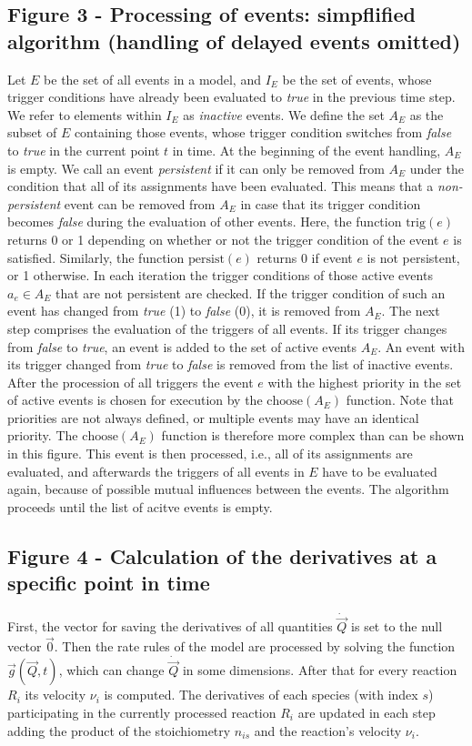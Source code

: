 \documentclass[10pt]{bmc_article}
\newenvironment{bmcformat}{\baselineskip20pt\sloppy\setboolean{publ}{false}}{\baselineskip20pt\sloppy}
\newcommand{\true}{\emph{true}}
\newcommand{\false}{\emph{false}}
\begin{document}
\begin{bmcformat}
\subsection*{Figure 3 - Processing of events: simpflified algorithm (handling of delayed events omitted)}
Let $E$ be the set of all events in a model, and $I_E$ be the set of events, whose trigger
conditions have already been evaluated to \true{} in the previous time step. We refer to elements within
$I_E$ as \emph{inactive} events. We define the set $A_E$ as the subset of $E$ containing those events,
whose trigger condition switches from \false{} to \true{} in the current point $t$ in time. At the beginning
of the event handling, $A_E$ is empty. We call an event \emph{persistent} if it can only be removed from
$A_E$ under the condition that all of its assignments have been evaluated. This means that a
\emph{non-persistent} event can be removed from $A_E$ in case that its trigger condition becomes \false{}
during the evaluation of other events. Here, the function $\mathrm{trig}(e)$ returns 0 or 1 depending 
on whether or not the trigger condition of the event $e$ is satisfied. Similarly, the function
$\mathrm{persist}(e)$ returns 0 if event $e$ is not persistent, or 1 otherwise.
In each iteration the trigger conditions of those active events $a_e \in A_E$ that are not persistent are checked.
If the trigger condition of such an event has changed from \true{} (1) to \false{} (0), it is removed from $A_E$.
The next step comprises the evaluation of the triggers of all events.
If its trigger changes from \false{} to \true{}, an event is added to the set of active events $A_E$.
An event with its trigger changed from \true{} to \false{} is removed from the list of inactive events.
After the procession of all triggers the event $e$ with the highest priority in the set of active events is chosen for execution by the $\mathrm{choose}(A_E)$ function.
Note that priorities are not always defined, or multiple events may have an identical priority. The $\mathrm{choose}(A_E)$ function is therefore more complex than can be shown in this figure.
This event is then processed, i.e., all of its assignments are evaluated, and afterwards the triggers of all events in $E$ have to be evaluated again, because of possible mutual influences between the events.
The algorithm proceeds until the list of acitve events is empty.

\subsection*{Figure 4 - Calculation of the derivatives at a specific point in time}
First, the vector for saving the derivatives of all quantities $\dot{\vec{Q}}$ is set to the null vector $\vec{0}$.
Then the rate rules of the model are processed by solving the function $\vec{g}(\vec{Q}, t)$, which can change $\dot{\vec{Q}}$ in some dimensions.
After that for every reaction $R_i$ its velocity $\nu_i$ is computed.
The derivatives of each species (with index $s$) participating in the currently processed reaction $R_i$ are updated
in each step adding the product of the stoichiometry $n_{is}$ and the reaction's velocity $\nu_i$.


\end{bmcformat}
\end{document}
